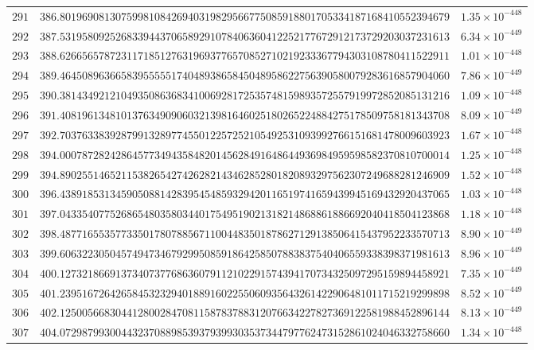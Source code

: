 \documentclass[12pt,reqno]{amsart}
\theoremstyle{remark}
\begin{document}
\begin{longtable}{clc}
$291$ & $386.8019690813075998108426940319829566775085918801705334187168410552394679$ & $1.35\times 10^{-448}$ \\
$292$ & $387.5319580925268339443706589291078406360412252177672912173729203037231613$ & $6.34\times 10^{-449}$ \\
$293$ & $388.6266565787231171851276319693776570852710219233367794303108780411522911$ & $1.01\times 10^{-448}$ \\
$294$ & $389.4645089636658395555517404893865845048958622756390580079283616857904060$ & $7.86\times 10^{-449}$ \\
$295$ & $390.3814349212104935086368341006928172535748159893572557919972852085131216$ & $1.09\times 10^{-448}$ \\
$296$ & $391.4081961348101376349090603213981646025180265224884275178509758181343708$ & $8.09\times 10^{-449}$ \\
$297$ & $392.7037633839287991328977455012257252105492531093992766151681478009603923$ & $1.67\times 10^{-448}$ \\
$298$ & $394.0007872824286457734943584820145628491648644936984959598582370810700014$ & $1.25\times 10^{-448}$ \\
$299$ & $394.8902551465211538265427426282143462852801820893297562307249688281246909$ & $1.52\times 10^{-448}$ \\
$300$ & $396.4389185313459050881428395454859329420116519741659439945169432920437065$ & $1.03\times 10^{-448}$ \\
$301$ & $397.0433540775268654803580344017549519021318214868861886692040418504123868$ & $1.18\times 10^{-448}$ \\
$302$ & $398.4877165535773350178078856711004483501878627129138506415437952233570713$ & $8.90\times 10^{-449}$ \\
$303$ & $399.6063223050457494734679299508591864258507883837540406559338398371981613$ & $8.96\times 10^{-449}$ \\
$304$ & $400.1273218669137340737768636079112102291574394170734325097295159894458921$ & $7.35\times 10^{-449}$ \\
$305$ & $401.2395167264265845323294018891602255060935643261422906481011715219299898$ & $8.52\times 10^{-449}$ \\
$306$ & $402.1250056683044128002847081158783788312076634227827369122581988452896144$ & $8.13\times 10^{-449}$ \\
$307$ & $404.0729879930044323708898539379399303537344797762473152861024046332758660$ & $1.34\times 10^{-448}$ \\

\end{longtable}
\end{document}
